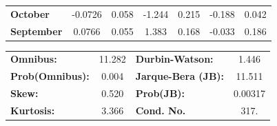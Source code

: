 \documentclass[a4paper,11pt]{article}
\begin{document}
\begin{center}
\begin{tabular}{lcccccc}
\textbf{October}               &      -0.0726  &        0.058     &    -1.244  &         0.215        &       -0.188    &        0.042     \\
\textbf{September}             &       0.0766  &        0.055     &     1.383  &         0.168        &       -0.033    &        0.186     \\
\bottomrule
\end{tabular}
\begin{tabular}{lclc}
\textbf{Omnibus:}       & 11.282 & \textbf{  Durbin-Watson:     } &    1.446  \\
\textbf{Prob(Omnibus):} &  0.004 & \textbf{  Jarque-Bera (JB):  } &   11.511  \\
\textbf{Skew:}          &  0.520 & \textbf{  Prob(JB):          } &  0.00317  \\
\textbf{Kurtosis:}      &  3.366 & \textbf{  Cond. No.          } &     317.  \\
\bottomrule
\end{tabular}
\end{center}
\newpage
\end{document}
